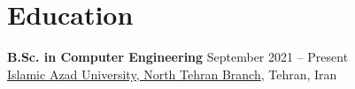 \documentclass[../main.tex]{subfiles}
\begin{document}
\section{Education}
\begin{category}
    \citembullet \textbf{B.Sc. in Computer Engineering} \hfill September 2021 -- Present \\
    \href{https://iau.ir/}{Islamic Azad University, North Tehran Branch}, Tehran, Iran 
\end{category}
\end{document}

